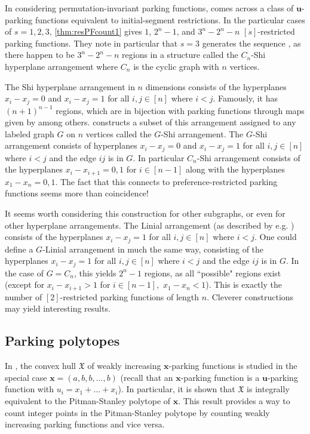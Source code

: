 \documentclass[12pt]{article}
\begin{document}
In considering permutation-invariant parking functions, \cite{chen-2023} comes across a class of $\mathbf{u}$-parking functions equivalent to initial-segment restrictions. In the particular cases of $s=1,2,3$, \cref{thm:resPFcount1} gives $1$, $2^n-1$, and $3^n-2^n-n$ $[s]$-restricted parking functions. They note in particular that $s=3$ generates the sequence \cite[A001263]{oeis}, as there happen to be $3^n-2^n-n$ regions in a structure called the $C_{n}$-Shi hyperplane arrangement where $C_{n}$ is the cyclic graph with $n$ vertices.

The Shi hyperplane arrangement in $n$ dimensions consists of the hyperplanes $x_i-x_j=0$ and $x_i-x_j=1$ for all $i,j\in[n]$ where $i<j$. Famously, it has $(n+1)^{n-1}$ regions, which are in bijection with parking functions through maps given by \cite{athanasiadis-linusson-1999} among others. \cite{bennett-2024} constructs a subset of this arrangement assigned to any labeled graph $G$ on $n$ vertices called the $G$-Shi arrangement. The $G$-Shi arrangement consists of hyperplanes $x_i-x_j=0$ and $x_i-x_j=1$ for all $i,j\in[n]$ where $i<j$ and the edge $ij$ is in $G$. In particular $C_n$-Shi arrangement consists of the hyperplanes $x_i-x_{i+1}=0,1$ for $i\in[n-1]$ along with the hyperplanes $x_1-x_n=0,1$. The fact that this connects to preference-restricted parking functions seems more than coincidence!

It seems worth considering this construction for other subgraphs, or even for other hyperplane arrangements. The Linial arrangement (as described by e.g. \cite{stanley-hyperplanes-2007}) consists of the hyperplanes $x_i-x_j=1$ for all $i,j\in[n]$ where $i<j.$ One could define a $G$-Linial arrangement in much the same way, consisting of the hyperplanes $x_i-x_j=1$ for all $i,j\in[n]$ where $i<j$ and the edge $ij$ is in $G$. In the case of $G=C_n$, this yields $2^n-1$ regions, as all ``possible" regions exist (except for $x_i-x_{i+1}>1$ for $i\in[n-1],$ $x_1-x_n<1$). This is exactly the number of $[2]$-restricted parking functions of length $n$. Cleverer constructions may yield interesting results.

\subsection{Parking polytopes}

In \cite{andres-others-2023}, the convex hull $\mathfrak{X}$ of weakly increasing $\mathbf{x}$-parking functions is studied in the special case $\mathbf{x} = (a, b, b, \dots, b)$ (recall that an $\mathbf{x}$-parking function is a $\mathbf{u}$-parking function with $u_{i} = x_{1} + \dots + x_{i}$). In particular, it is shown that $\mathfrak{X}$ is integrally equivalent to the Pitman-Stanley polytope of $\mathbf{x}$. This result provides a way to count integer points in the Pitman-Stanley polytope by counting weakly increasing parking functions and vice versa.
\end{document}
